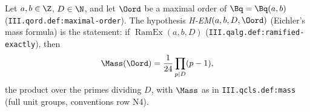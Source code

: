 Let $a,b\in\Z$, $D\in\N$, and let $\Oord$ be a maximal order of $\Bq=\Bq(a,b)$ (\texttt{III.qord.def:maximal-order}). The hypothesis
\emph{H-EM}$(a,b,D,\Oord)$ (Eichler's mass formula) is the statement: if $\operatorname{RamEx}(a,b,D)$ (\texttt{III.qalg.def:ramified-exactly}), then
\[
  \Mass(\Oord)=\frac1{24}\prod_{p\mid D}(p-1),
\]
the product over the primes dividing $D$, with $\Mass$ as in \texttt{III.qcls.def:mass} (full unit groups, conventions row N4).
